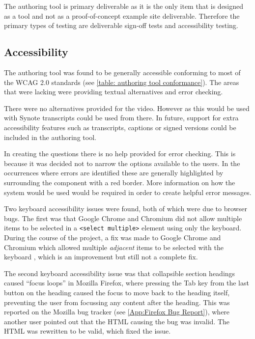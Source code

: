 The authoring tool is primary deliverable as it is the only item that is designed as a tool and not as a proof-of-concept example site deliverable. Therefore the primary types of testing are deliverable sign-off tests and accessibility testing.

\subsection{Accessibility}
\label{Section:Testing_Authoring_tool_accessibility}

The authoring tool was found to be generally accessible conforming to most of the \gls{WCAG} 2.0 standards (see \autoref{table: authoring tool conformance}). The areas that were lacking were providing textual alternatives and error checking.

There were no alternatives provided for the video. However as this would be used with Synote transcripts could be used from there. In future, support for extra accessibility features such as transcripts, captions or signed versions could be included in the authoring tool.

In creating the questions there is no help provided for error checking. This is because it was decided not to narrow the options available to the users. In the occurrences where errors are identified these are generally highlighted by surrounding the component with a red border. More information on how the system would be used would be required in order to create helpful error messages.

Two keyboard accessibility issues were found, both of which were due to browser bugs. The first was that Google Chrome and Chromium did not allow multiple items to be selected in a \texttt{\textless select multiple\textgreater} element using only the keyboard. During the course of the project, a fix was made to Google Chrome and Chromium which allowed multiple \textit{adjacent} items to be selected with the keyboard \citep{ChromiumMultipleSelectBug}, which is an improvement but still not a complete fix.

The second keyboard accessibility issue was that collapsible section headings caused ``focus loops'' in Mozilla Firefox, where pressing the Tab key from the last button on the heading caused the focus to move back to the heading itself, preventing the user from focussing any content after the heading. This was reported on the Mozilla bug tracker \citep{FirefoxFocusLoopBug} (see \cref{App:Firefox Bug Report}), where another user pointed out that the HTML causing the bug was invalid. The HTML was rewritten to be valid, which fixed the issue.

